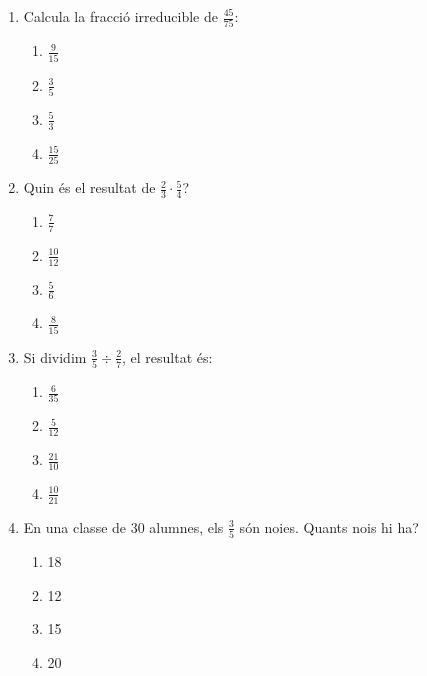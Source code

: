 \documentclass[a4paper, 11pt]{article}
\begin{document}
\begin{enumerate}[label=\textbf{\arabic*.}]
    \item Calcula la fracció irreducible de $\frac{45}{75}$:
    \begin{multicols}{4}
    \begin{enumerate}[label=\Alph*)]
        \item $\frac{9}{15}$ \item $\frac{3}{5}$ \item $\frac{5}{3}$ \item $\frac{15}{25}$
    \end{enumerate}
    \end{multicols}

    \item Quin és el resultat de $\frac{2}{3} \cdot \frac{5}{4}$?
    \begin{multicols}{4}
    \begin{enumerate}[label=\Alph*)]
        \item $\frac{7}{7}$ \item $\frac{10}{12}$ \item $\frac{5}{6}$ \item $\frac{8}{15}$
    \end{enumerate}
    \end{multicols}

    \item Si dividim $\frac{3}{5} \div \frac{2}{7}$, el resultat és:
    \begin{multicols}{4}
    \begin{enumerate}[label=\Alph*)]
        \item $\frac{6}{35}$ \item $\frac{5}{12}$ \item $\frac{21}{10}$ \item $\frac{10}{21}$
    \end{enumerate}
    \end{multicols}

    \item En una classe de 30 alumnes, els $\frac{3}{5}$ són noies. Quants nois hi ha?
    \begin{multicols}{4}
    \begin{enumerate}[label=\Alph*)]
        \item 18 \item 12 \item 15 \item 20
    \end{enumerate}
    \end{multicols}


\end{enumerate}
\end{document}
